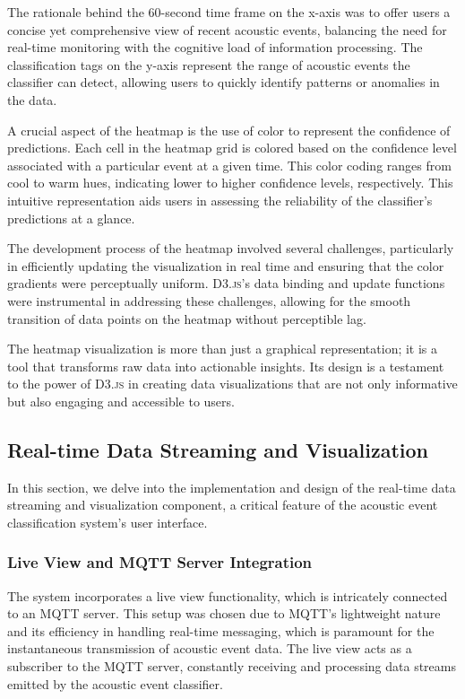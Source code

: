 The rationale behind the 60-second time frame on the x-axis was to offer users a concise yet comprehensive view of recent acoustic events, balancing the need for real-time monitoring with the cognitive load of information processing. The classification tags on the y-axis represent the range of acoustic events the classifier can detect, allowing users to quickly identify patterns or anomalies in the data.

A crucial aspect of the heatmap is the use of color to represent the confidence of predictions. Each cell in the heatmap grid is colored based on the confidence level associated with a particular event at a given time. This color coding ranges from cool to warm hues, indicating lower to higher confidence levels, respectively. This intuitive representation aids users in assessing the reliability of the classifier’s predictions at a glance.

The development process of the heatmap involved several challenges, particularly in efficiently updating the visualization in real time and ensuring that the color gradients were perceptually uniform. \textsc{D3.js}'s data binding and update functions were instrumental in addressing these challenges, allowing for the smooth transition of data points on the heatmap without perceptible lag.

The heatmap visualization is more than just a graphical representation; it is a tool that transforms raw data into actionable insights. Its design is a testament to the power of \textsc{D3.js} in creating data visualizations that are not only informative but also engaging and accessible to users.

\subsection{Real-time Data Streaming and Visualization}
In this section, we delve into the implementation and design of the real-time data streaming and visualization component, a critical feature of the acoustic event classification system's user interface.

\subsubsection{Live View and MQTT Server Integration}
The system incorporates a live view functionality, which is intricately connected to an MQTT server. This setup was chosen due to MQTT's lightweight nature and its efficiency in handling real-time messaging, which is paramount for the instantaneous transmission of acoustic event data. The live view acts as a subscriber to the MQTT server, constantly receiving and processing data streams emitted by the acoustic event classifier.

